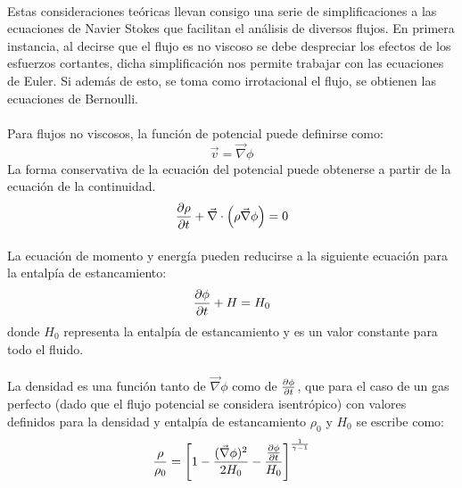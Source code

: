 \documentclass[letterpaper, openright, 12pt]{book}
\begin{document}
    \paragraph*{}
        Estas consideraciones teóricas llevan consigo una serie de
        simplificaciones a las ecuaciones de Navier Stokes que facilitan el
        análisis de diversos flujos. En primera instancia, al decirse que el
        flujo es no viscoso se debe despreciar los efectos de los esfuerzos
        cortantes, dicha simplificación nos permite trabajar con las ecuaciones
        de Euler. Si además de esto, se toma como irrotacional el flujo, se
        obtienen las ecuaciones de Bernoulli.

    \paragraph*{}
        Para flujos no viscosos, la función de potencial puede definirse
        como:
        \begin{equation}
            \vec{v} = \vec{\nabla} \phi
            \label{u_eq_phi}
        \end{equation}
        La forma conservativa de la ecuación del potencial puede obtenerse a
        partir de la ecuación de la continuidad.
        \begin{equation}
            \pdv{\rho}{t} + \vec{\nabla} \cdot \left( \rho \vec{\nabla} \phi \right) = 0
        \end{equation}

    \paragraph*{}
        La ecuación de momento y energía pueden reducirse a la siguiente
        ecuación para la entalpía de estancamiento:
        \begin{equation}
            \pdv{\phi}{t} + H = H_{0}
        \end{equation}
        donde $H_0$ representa la entalpía de estancamiento y es un valor constante para todo el fluido.

    \paragraph*{}
        La densidad es una función tanto de $\vec{\nabla} \phi$ como de
        $\pdv{\phi}{t}$, que para el caso de un gas perfecto (dado que el
        flujo potencial se considera isentrópico) con valores
        definidos para la densidad y entalpía de estancamiento $\rho_{0}$
        y $H_{0}$ se escribe como:
        \begin{equation}
            \frac{\rho}{\rho_{0}} = \left[ 1
                - \frac{(\vec{\nabla} \phi) ^ 2}{2 H_0}
                - \frac{\pdv{\phi}{t}}{H_0} \right]^{\frac{1}{\gamma - 1}}
            \label{density}
        \end{equation}
\end{document}
